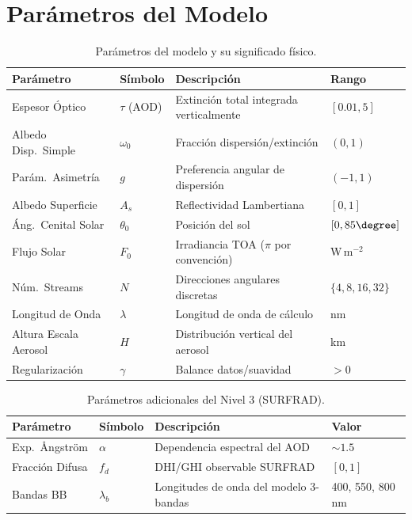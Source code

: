 \documentclass[a4paper,11pt]{article}
\begin{document}
\section{Par\'ametros del Modelo}

\begin{table}[H]
\centering
\small
\begin{tabular}{@{}llp{6.5cm}l@{}}
\toprule
\textbf{Par\'ametro} & \textbf{S\'imbolo} & \textbf{Descripci\'on} & \textbf{Rango} \\ \midrule
Espesor \'Optico & $\tau$ (AOD) & Extinci\'on total integrada verticalmente & $[0.01, 5]$ \\
Albedo Disp.\ Simple & $\omega_0$ & Fracci\'on dispersi\'on/extinci\'on & $(0, 1)$ \\
Par\'am.\ Asimetr\'ia & $g$ & Preferencia angular de dispersi\'on & $(-1, 1)$ \\
Albedo Superficie & $A_s$ & Reflectividad Lambertiana & $[0, 1]$ \\
\'Ang.\ Cenital Solar & $\theta_0$ & Posici\'on del sol & $[0, 85\degree]$ \\
Flujo Solar & $F_0$ & Irradiancia TOA ($\pi$ por convenci\'on) & W\,m$^{-2}$ \\
N\'um.\ Streams & $N$ & Direcciones angulares discretas & $\{4,8,16,32\}$ \\
Longitud de Onda & $\lambda$ & Longitud de onda de c\'alculo & nm \\
Altura Escala Aerosol & $H$ & Distribuci\'on vertical del aerosol & km \\
Regularizaci\'on & $\gamma$ & Balance datos/suavidad & $> 0$ \\
\bottomrule
\end{tabular}
\caption{Par\'ametros del modelo y su significado f\'isico.}
\end{table}

\begin{table}[H]
\centering
\small
\begin{tabular}{@{}llp{6.5cm}l@{}}
\toprule
\textbf{Par\'ametro} & \textbf{S\'imbolo} & \textbf{Descripci\'on} & \textbf{Valor} \\ \midrule
Exp.\ \AA ngstr\"om & $\alpha$ & Dependencia espectral del AOD & $\sim 1.5$ \\
Fracci\'on Difusa & $f_d$ & DHI/GHI observable SURFRAD & $[0, 1]$ \\
Bandas BB & $\lambda_b$ & Longitudes de onda del modelo 3-bandas & 400, 550, 800\,nm \\
\bottomrule
\end{tabular}
\caption{Par\'ametros adicionales del Nivel 3 (SURFRAD).}
\end{table}
\end{document}
